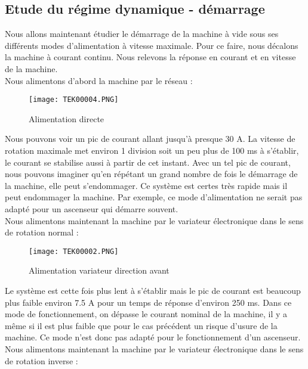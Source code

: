 \documentclass[oneside,a4paper,12pt]{article}
\begin{document}
	\subsection{Etude du régime dynamique - démarrage}
	
	Nous allons maintenant étudier le démarrage de la machine à vide sous ses différents modes d’alimentation à vitesse maximale. Pour ce faire, nous décalons la machine à courant continu. Nous relevons la réponse en courant et en vitesse de la machine.\\
	Nous alimentons d’abord la machine par le réseau : \\
	
	\begin{figure}[h]
		\centering
		\texttt{[image: TEK00004.PNG]}
		\caption{Alimentation directe}
	\end{figure}
	
	Nous pouvons voir un pic de courant allant jusqu’à presque 30 A. La vitesse de rotation maximale met environ 1 division soit un peu plus de 100 ms à s’établir, le courant se stabilise aussi à partir de cet instant. Avec un tel pic de courant, nous pouvons imaginer qu'en répétant un grand nombre de fois le démarrage de la machine, elle peut s’endommager. Ce système est certes très rapide mais il peut endommager la machine. Par exemple, ce mode d’alimentation ne serait pas adapté pour un ascenseur qui démarre souvent.\\
	Nous alimentons maintenant la machine par le variateur électronique dans le sens de rotation normal :\\
	
	\begin{figure}[h]
		\centering
		\texttt{[image: TEK00002.PNG]}
		\caption{Alimentation variateur direction avant}
	\end{figure}
	\newpage
	
	Le système est cette fois plus lent à s’établir mais le pic de courant est beaucoup plus faible environ 7.5 A pour un temps de réponse d’environ 250 ms. Dans ce mode de fonctionnement, on dépasse le courant nominal de la machine, il y a même si il est plus faible que pour le cas précédent un risque d’usure de la machine. Ce mode n’est donc pas adapté pour le fonctionnement d’un ascenseur.\\
	
	Nous alimentons maintenant la machine par le variateur électronique dans le sens de rotation inverse :\\
	
\end{document}

